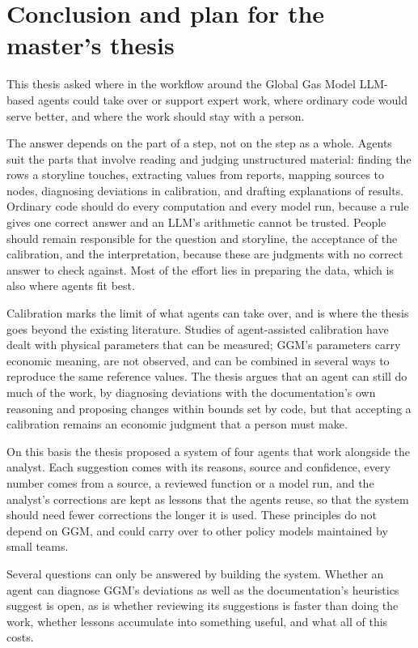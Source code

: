 \section{Conclusion and plan for the master's thesis}

This thesis asked where in the workflow around the Global Gas Model LLM-based agents could take over or support expert work, where ordinary code would serve better, and where the work should stay with a person.

The answer depends on the part of a step, not on the step as a whole.
Agents suit the parts that involve reading and judging unstructured material: finding the rows a storyline touches, extracting values from reports, mapping sources to nodes, diagnosing deviations in calibration, and drafting explanations of results.
Ordinary code should do every computation and every model run, because a rule gives one correct answer and an LLM's arithmetic cannot be trusted.
People should remain responsible for the question and storyline, the acceptance of the calibration, and the interpretation, because these are judgments with no correct answer to check against.
Most of the effort lies in preparing the data, which is also where agents fit best.

Calibration marks the limit of what agents can take over, and is where the thesis goes beyond the existing literature.
Studies of agent-assisted calibration have dealt with physical parameters that can be measured; GGM's parameters carry economic meaning, are not observed, and can be combined in several ways to reproduce the same reference values.
The thesis argues that an agent can still do much of the work, by diagnosing deviations with the documentation's own reasoning and proposing changes within bounds set by code, but that accepting a calibration remains an economic judgment that a person must make.

On this basis the thesis proposed a system of four agents that work alongside the analyst.
Each suggestion comes with its reasons, source and confidence, every number comes from a source, a reviewed function or a model run, and the analyst's corrections are kept as lessons that the agents reuse, so that the system should need fewer corrections the longer it is used.
These principles do not depend on GGM, and could carry over to other policy models maintained by small teams.

Several questions can only be answered by building the system.
Whether an agent can diagnose GGM's deviations as well as the documentation's heuristics suggest is open, as is whether reviewing its suggestions is faster than doing the work, whether lessons accumulate into something useful, and what all of this costs.

